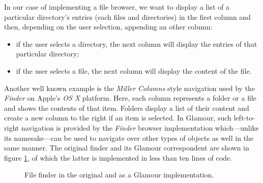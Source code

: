 \documentclass[a4paper,10pt,twoside]{book}
\begin{document}

In our case of implementing a file browser, we want to display a list
of a particular directory's entries (each files and directories) in
the first column and then, depending on the user selection, appending
an other column:

\begin{itemize}
\item if the user selects a directory, the next column will display
  the entries of that particular directory;
\item if the user selects a file, the next column will display the
  content of the file.
\end{itemize}


 Another well known example is the \emph{Miller Columns} style navigation used by the \emph{Finder} on Apple's \emph{OS X} platform. Here, each column represents a folder or a file and shows the contents of that item. Folders display a list of their content and create a new column to the right if an item is selected. In Glamour, such left-to-right navigation is provided by the \emph{Finder} browser implementation which---unlike its namesake---can be used to navigate over other types of objects as well in the same manner. The original finder and its Glamour correspondent are shown in figure \ref{fig:casestudies/file_finder}, of which the latter is implemented in less than ten lines of code.

\begin{figure}[tbp]
\begin{center}
\caption{File finder in the original and as a Glamour implementation.}
\label{fig:casestudies/file_finder}
\end{center}
\end{figure}
\end{document}
